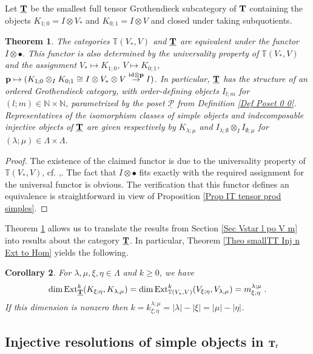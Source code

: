 \documentclass[12pt]{article}
\def\NN {{\mathbb N}}     %
\def\TT {{\mathbb T}}     %
\def\mc {\mathcal}
\def\ul  {\underline}
\newtheorem{theorem}{Theorem}[section]
\newtheorem{coro}[theorem]{Corollary}
\begin{document}
Let $\ul{\bf T}$ be the smallest full tensor Grothendieck subcategory of ${\bf T}$ containing the objects $K_{1;0}=I\otimes V_*$ and $K_{0;1}=I\otimes V$ and closed under taking subquotients.

\begin{theorem}\label{Theo smallIT smallTT}
The categories $\TT(V_*,V)$ and $\ul{\bf T}$ are equivalent under the functor $I\otimes\bullet$. This functor is also determined by the universality property of $\TT(V_*,V)$ and the assignment $V_*\mapsto K_{1;0}$, $V\mapsto K_{0;1}$, ${\bf p} \mapsto (K_{1;0}\otimes_I K_{0;1}\cong I\otimes V_*\otimes V\stackrel{{\rm id}\otimes{\bf p}}{\to} I)$. In particular, $\ul{\bf T}$ has the structure of an ordered Grothendieck category, with order-defining objects $I_{l;m}$ for $(l;m)\in\NN\times\NN$, parametrized by the poset $\ul{\mc P}$ from Definition \ref{Def Poset 0 0}. Representatives of the isomorphism classes of simple objects and indecomposable injective objects of $\ul{\bf T}$ are given respectively by $K_{\lambda;\mu}$ and $I_{\lambda;\emptyset}\otimes_I I_{\emptyset;\mu}$ for $(\lambda;\mu)\in\Lambda\times\Lambda$.
\end{theorem}

\begin{proof}
The existence of the claimed functor is due to the universality property of $\TT(V_*,V)$, cf. \cite{Penkov-Serganova-Mackey},\cite{Chirvasitu-Penkov-OTC}. The fact that $I\otimes\bullet$ fits exactly with the required assignment for the universal functor is obvious. The verification that this functor defines an equivalence is straightforward in view of Proposition \ref{Prop IT tensor prod simples}.
\end{proof}

Theorem \ref{Theo smallIT smallTT} allows us to translate the results from Section \ref{Sec Vstar l po V m} into results about the category $\ul{\bf T}$. In particular, Theorem \ref{Theo smallTT Inj n Ext to Hom} yields the following.

\begin{coro}\label{Coro smallIT Ext}
For $\lambda,\mu,\xi,\eta\in\Lambda$ and $k\geq 0$, we have
$$
\dim{\rm Ext}^k_{\ul{\bf T}}(K_{\xi;\eta},K_{\lambda,\mu}) = \dim{\rm Ext}^k_{\TT(V_*,V)}(V_{\xi;\eta},V_{\lambda,\mu}) = m^{\lambda;\mu}_{\xi,\eta} \;.
$$
If this dimension is nonzero then $k=k^{\lambda;\mu}_{\xi;\eta}=|\lambda|-|\xi|=|\mu|-|\eta|$.
\end{coro}


\subsection{Injective resolutions of simple objects in ${\bf T}_t$}
\end{document}
